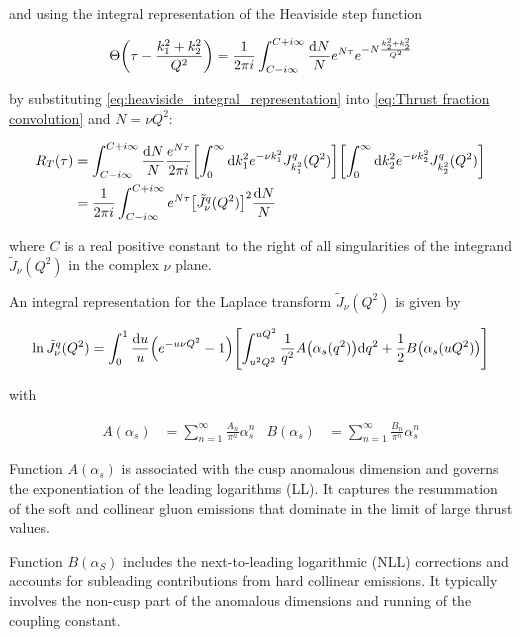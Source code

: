 \documentclass[../main.tex]{subfiles}
\begin{document}
and using the integral representation of the Heaviside step function

\begin{equation} \label{eq:heaviside_integral_representation}
    \Theta\qty(\tau - \frac{k_1^2+k_2^2}{Q^2}) = \frac{1}{2\pi i} \int_{C-i\infty}^{C+i\infty} \frac{\dd N}{N} e^{N \tau} e^{- N \frac{k_2^2+k_2^2}{Q^2}} 
\end{equation}

by substituting \cref{eq:heaviside_integral_representation} into \cref{eq:Thrust fraction convolution} and $N= \nu Q^2$:

\begin{align}
    \begin{split} \label{eq:Thrust fraction}
    R_T(\tau) &= \int_{C - i \infty}^{C + i\infty} \frac{\dd N}{N} \frac{e^{N \tau}}{2\pi i} \qty[\int_0^\infty \dd k_1^2 e^{-\nu k_1^2} J^q_{k_1^2}(Q^2) ] \qty[\int_0^\infty \dd k_2^2 e^{-\nu k_2^2} J^q_{k_2^2}(Q^2)]\\
    &=\frac{1}{2\pi i}\int_{C - i \infty}^{C + i\infty} e^{N \tau} \qty[\tilde{J}_\nu^q(Q^2)]^2 \frac{\dd N}{N}
    \end{split}
\end{align}

where $C$ is a real positive constant to the right of all singularities of the integrand $\tilde{J}_\nu(Q^2)$ in the complex $\nu$ plane. 

An integral representation for the Laplace transform $\tilde{J}_\nu(Q^2)$ is given by

\begin{equation}\label{eq:master formula}
    \ln \tilde{J}_\nu^q(Q^2) = \int_0^1 \frac{\dd u}{u} \qty(e^{-u \nu Q^2}-1)\qty[ \int_{u^2 Q^2}^{u Q^2} \frac{1}{q^2} A\qty(\alpha_s(q^2)) \dd q^2 + \frac{1}{2} B\qty(\alpha_s(u Q^2))]
\end{equation}

with 

\begin{align*}
    A(\alpha_s) &= \sum_{n=1}^\infty \frac{A_n}{\pi^n}\alpha_s^n & B(\alpha_s) &= \sum_{n=1}^\infty \frac{B_n}{\pi^n}\alpha_s^n
\end{align*}

Function $A(\alpha_s)$ is associated with the cusp anomalous dimension and governs the exponentiation of the leading logarithms (LL). 
It captures the resummation of the soft and collinear gluon emissions that dominate in the limit of large thrust values.

Function $B(\alpha_S)$ includes the next-to-leading logarithmic (NLL) corrections and accounts for subleading contributions from hard collinear emissions.
It typically involves the non-cusp part of the anomalous dimensions and running of the coupling constant.
\end{document}
